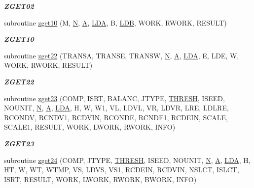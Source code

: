 \begin{DoxyCompactItemize}
\begin{DoxyCompactList}\small\item\em {\bfseries Z\+G\+E\+T02} \end{DoxyCompactList}\item 
subroutine \hyperlink{group__complex16__eig_gac9dffccc2faf3942bfc7d9ae4c92be0e}{zget10} (M, \hyperlink{polmisc_8c_a0240ac851181b84ac374872dc5434ee4}{N}, \hyperlink{classA}{A}, \hyperlink{example__user_8c_ae946da542ce0db94dced19b2ecefd1aa}{L\+D\+A}, B, \hyperlink{example__user_8c_a50e90a7104df172b5a89a06c47fcca04}{L\+D\+B}, W\+O\+R\+K, R\+W\+O\+R\+K, R\+E\+S\+U\+L\+T)
\begin{DoxyCompactList}\small\item\em {\bfseries Z\+G\+E\+T10} \end{DoxyCompactList}\item 
subroutine \hyperlink{group__complex16__eig_ga2613f5765953757de881b744e9b72725}{zget22} (T\+R\+A\+N\+S\+A, T\+R\+A\+N\+S\+E, T\+R\+A\+N\+S\+W, \hyperlink{polmisc_8c_a0240ac851181b84ac374872dc5434ee4}{N}, \hyperlink{classA}{A}, \hyperlink{example__user_8c_ae946da542ce0db94dced19b2ecefd1aa}{L\+D\+A}, E, L\+D\+E, W, W\+O\+R\+K, R\+W\+O\+R\+K, R\+E\+S\+U\+L\+T)
\begin{DoxyCompactList}\small\item\em {\bfseries Z\+G\+E\+T22} \end{DoxyCompactList}\item 
subroutine \hyperlink{group__complex16__eig_gafff141ca176900b033d426a3442a5971}{zget23} (C\+O\+M\+P, I\+S\+R\+T, B\+A\+L\+A\+N\+C, J\+T\+Y\+P\+E, \hyperlink{zlaqgs_8c_a0656018abfc9fa2821827415f5d5ea57}{T\+H\+R\+E\+S\+H}, I\+S\+E\+E\+D, N\+O\+U\+N\+I\+T, \hyperlink{polmisc_8c_a0240ac851181b84ac374872dc5434ee4}{N}, \hyperlink{classA}{A}, \hyperlink{example__user_8c_ae946da542ce0db94dced19b2ecefd1aa}{L\+D\+A}, H, W, W1, V\+L, L\+D\+V\+L, V\+R, L\+D\+V\+R, L\+R\+E, L\+D\+L\+R\+E, R\+C\+O\+N\+D\+V, R\+C\+N\+D\+V1, R\+C\+D\+V\+I\+N, R\+C\+O\+N\+D\+E, R\+C\+N\+D\+E1, R\+C\+D\+E\+I\+N, S\+C\+A\+L\+E, S\+C\+A\+L\+E1, R\+E\+S\+U\+L\+T, W\+O\+R\+K, L\+W\+O\+R\+K, R\+W\+O\+R\+K, I\+N\+F\+O)
\begin{DoxyCompactList}\small\item\em {\bfseries Z\+G\+E\+T23} \end{DoxyCompactList}\item 
subroutine \hyperlink{group__complex16__eig_ga856fb6d577946eb001db09bd7a0bb2d3}{zget24} (C\+O\+M\+P, J\+T\+Y\+P\+E, \hyperlink{zlaqgs_8c_a0656018abfc9fa2821827415f5d5ea57}{T\+H\+R\+E\+S\+H}, I\+S\+E\+E\+D, N\+O\+U\+N\+I\+T, \hyperlink{polmisc_8c_a0240ac851181b84ac374872dc5434ee4}{N}, \hyperlink{classA}{A}, \hyperlink{example__user_8c_ae946da542ce0db94dced19b2ecefd1aa}{L\+D\+A}, H, H\+T, W, W\+T, W\+T\+M\+P, V\+S, L\+D\+V\+S, V\+S1, R\+C\+D\+E\+I\+N, R\+C\+D\+V\+I\+N, N\+S\+L\+C\+T, I\+S\+L\+C\+T, I\+S\+R\+T, R\+E\+S\+U\+L\+T, W\+O\+R\+K, L\+W\+O\+R\+K, R\+W\+O\+R\+K, B\+W\+O\+R\+K, I\+N\+F\+O)

\end{DoxyCompactItemize}

